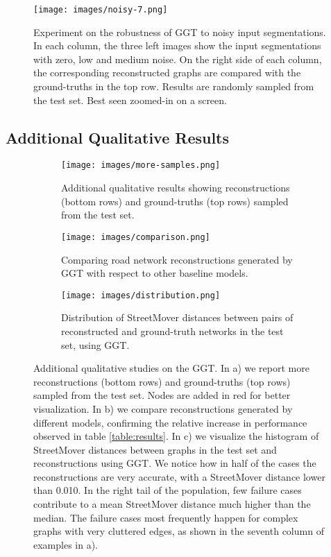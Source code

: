 \documentclass{article}
\begin{document}
\begin{figure}[h]
    \centering
    \vskip -0.15in
    \texttt{[image: images/noisy-7.png]}
    \vskip -0.05in
\caption{Experiment on the robustness of GGT to noisy input segmentations. In each column, the three left images show the input segmentations with zero, low and medium noise. On the right side of each column, the corresponding reconstructed graphs are compared with the ground-truths in the top row. Results are randomly sampled from the test set. Best seen zoomed-in on a screen.}
    \label{fig:noisy}
    \vskip -0.15in
\end{figure}


\subsection{Additional Qualitative Results}

\begin{figure}[h]
    \centering
    \begin{subfigure}[ht]{0.99\textwidth}
    \centering
    \vskip -0.15in
    \texttt{[image: images/more-samples.png]}
    \caption{Additional qualitative results showing reconstructions (bottom rows) and ground-truths (top rows) sampled from the test set.}
    \label{fig:add-a}
\end{subfigure}
\begin{subfigure}[ht]{0.5\textwidth}
    \centering
    \texttt{[image: images/comparison.png]}
    \vspace*{5px}
    \caption{Comparing road network reconstructions generated by GGT with respect to other baseline models. }
    \vspace*{5px}
    \vskip 0.1in
    \label{fig:add-b}
\end{subfigure}
\hskip 0.1in
    \begin{subfigure}[ht]{0.455\textwidth}
        \centering
        \texttt{[image: images/distribution.png]}
        \vskip -0.05in
        \caption{Distribution of StreetMover distances between pairs of reconstructed and ground-truth networks in the test set, using GGT.}
        \vskip 0.1in
        \label{fig:add-c}
    \end{subfigure}
\vskip -0.15in
\caption{Additional qualitative studies on the GGT. In a) we report more reconstructions (bottom rows) and ground-truths (top rows) sampled from the test set. Nodes are added in red for better visualization. In b) we compare reconstructions generated by different models, confirming the relative increase in performance observed in table \ref{table:results}. In c) we visualize the histogram of StreetMover distances between graphs in the test set and reconstructions using GGT. We notice how in half of the cases the reconstructions are very accurate, with a StreetMover distance lower than 0.010. In the right tail of the population, few failure cases contribute to a mean StreetMover distance much higher than the median. The failure cases most frequently happen for complex graphs with very cluttered edges, as shown in the seventh column of examples in a).}
    \label{fig:additional-results}
    \vskip -0.15in
    \end{figure}
    
\end{document}
